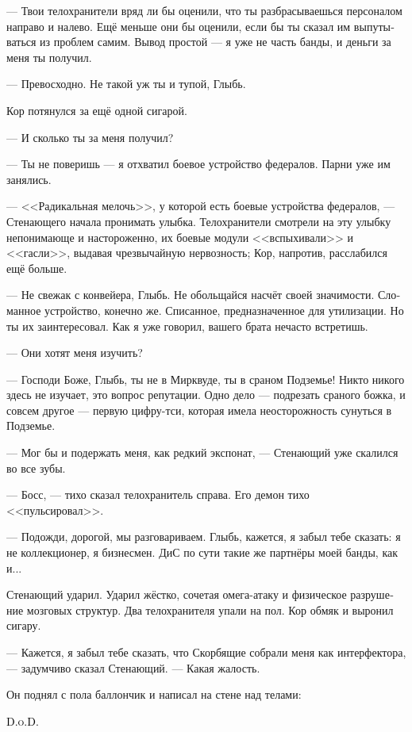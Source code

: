 \documentclass[a4paper,12pt,fleqn]{book}\usepackage{cooltooltips}\usepackage{polyglossia}\setdefaultlanguage[babelshorthands=true]{russian}\setotherlanguage{english}\defaultfontfeatures{Ligatures=TeX,Mapping=tex-text} \usepackage{xcolor}\definecolor{lightgray}{HTML}{bbbbbb}\color{lightgray}\newcommand{\ml}[3]{\textenglish{\textcolor{black}{#3}}}
\begin{document}
--- Твои телохранители вряд ли бы оценили, что ты разбрасываешься персоналом направо и налево.
Ещё меньше они бы оценили, если бы ты сказал им выпутываться из проблем самим.
Вывод простой --- я уже не часть банды, и деньги за меня ты получил.

--- Превосходно.
Не такой уж ты и тупой, Глыбь.

Кор потянулся за ещё одной сигарой.

--- И сколько ты за меня получил?

--- Ты не поверишь --- я отхватил боевое устройство федералов.
Парни уже им занялись.

--- <<Радикальная мелочь>>, у которой есть боевые устройства федералов, --- Стенающего начала пронимать улыбка.
Телохранители смотрели на эту улыбку непонимающе и настороженно, их боевые модули <<вспыхивали>> и <<гасли>>, выдавая чрезвычайную нервозность;
Кор, напротив, расслабился ещё больше.

--- Не свежак с конвейера, Глыбь.
Не обольщайся насчёт своей значимости.
Сломанное устройство, конечно же.
Списанное, предназначенное для утилизации.
Но ты их заинтересовал.
Как я уже говорил, вашего брата нечасто встретишь.

--- Они хотят меня изучить?

--- Господи Боже, Глыбь, ты не в Мирквуде, ты в сраном Подземье!
Никто никого здесь не изучает, это вопрос репутации.
Одно дело --- подрезать сраного божка, и совсем другое --- первую цифру-тси, которая имела неосторожность сунуться в Подземье.

--- Мог бы и подержать меня, как редкий экспонат, --- Стенающий уже скалился во все зубы.

--- Босс, --- тихо сказал телохранитель справа.
Его демон тихо <<пульсировал>>.

--- Подожди, дорогой, мы разговариваем.
Глыбь, кажется, я забыл тебе сказать: я не коллекционер, я бизнесмен.
ДиС по сути такие же партнёры моей банды, как и...

Стенающий ударил.
Ударил жёстко, сочетая омега-атаку и физическое разрушение мозговых структур.
Два телохранителя упали на пол.
Кор обмяк и выронил сигару.

--- Кажется, я забыл тебе сказать, что Скорбящие собрали меня как интерфектора, --- задумчиво сказал Стенающий.
--- Какая жалость.

Он поднял с пола баллончик и написал на стене над телами:

\ml{$0$}
{Д.и.С.}
{\textsc{D.o.D.}}
\end{document}
